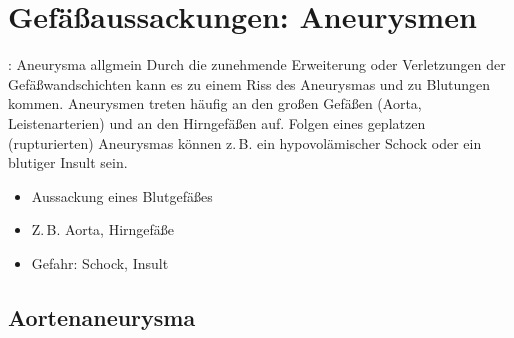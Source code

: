 \bigskip

\section{Gefäßaussackungen: Aneurysmen}
\label{topic:aneurysma}

{{\TxBeschreibung}: Aneurysma allgmein}
{%
Durch die
zunehmende Erweiterung oder Verletzungen der
Gefäßwandschichten kann es zu einem Riss des Aneurysmas und
zu Blutungen kommen. Aneurysmen treten häufig an den großen
Gefäßen (Aorta, Leistenarterien) und an den Hirngefäßen auf.
Folgen eines geplatzen (rupturierten) Aneurysmas können
z.\,B. ein hypovolämischer Schock oder ein blutiger Insult
sein.}
{
\begin{itemize}
  \item Aussackung eines Blutgefäßes
  \item Z.\,B. Aorta, Hirngefäße
  \item Gefahr: Schock, Insult
\end{itemize}
}
{}
{}
{}



\subsection{Aortenaneurysma}

\label{topic:thoraxaortenaneurysma}
\label{topic:bauchaortenaneurysma}
\nocite{Meron2004}

